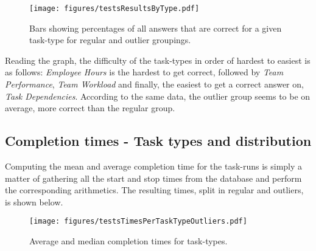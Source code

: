     \begin{figure}[h!]
      \centering
      \texttt{[image: figures/testsResultsByType.pdf]}
      \caption{
        Bars showing percentages of all answers that are correct for a
        given task-type for regular and outlier groupings.
      }
    \end{figure}

    Reading the graph, the difficulty of the task-types in order of hardest
    to easiest is as follows: \textit{Employee Hours} is the hardest to get
    correct, followed by \textit{Team Performance}, \textit{Team Workload}
    and finally, the easiest to get a correct answer on, \textit{Task
      Dependencies}. According to the same data, the outlier group seems to
    be on average, more correct than the regular group.



%
  \subsection{Completion times - Task types and distribution}

    Computing the mean and average completion time for the task-runs is
    simply a matter of gathering all the start and stop times from the
    database and perform the corresponding arithmetics. The resulting times,
    split in regular and outliers, is shown below.

    \begin{figure}[h!]
      \centering
      \texttt{[image: figures/testsTimesPerTaskTypeOutliers.pdf]}
      \vspace{-0.3cm}
      \caption{Average and median completion times for task-types. }
      \label{label_testsTimesPerTaskTypeOutliers}
    \end{figure}


